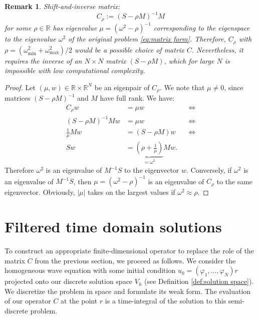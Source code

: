 \documentclass[a4paper,11pt,bibliography=totoc,listof=totoc,headinclude=true,cleardoublepage=empty,oneside]{scrbook}
\newtheorem{rem}[theorem]{Remark}
\newcommand{\R}{\mathbb{R}}
\begin{document}
\begin{rem}
    Shift-and-inverse matrix:
    \begin{equation*}
        C_\rho := (S - \rho M)^{-1}M
    \end{equation*}
    for some $\rho \in \R$ has eigenvalue $\mu = (\omega^2 - \rho)^{-1}$ corresponding to the eigenspace to the eigenvalue $\omega^2$ of the original problem \eqref{eq:matrix form}. Therefore, $C_\rho$ with $\rho = (\omega^2_{\min}+\omega^2_{\max})/2 $ would be a possible choice of matrix $C$. Nevertheless, it requires the inverse of an $N\times N$ matrix $(S - \rho M)$, which for large $N$ is impossible with low computational complexity.
\end{rem}

\begin{proof}
    Let $(\mu, w)\in \R\times\R^N$ be an eigenpair of $C_\rho$. We note that $\mu \neq 0$, since matrices $(S-\rho M)^{-1}$ and $M$ have full rank. We have:
    \begin{align*}
        C_\rho w &= \mu w &&\iff \\
        (S - \rho M)^{-1}Mw &= \mu w  &&\iff \\
        \frac{1}{\mu}Mw &= (S - \rho M)w &&\iff \\
        Sw &= \underbrace{\left(\rho + \frac{1}{\mu}\right)}_{=\omega^2} Mw.&& 
    \end{align*}
    Therefore $\omega^2$ is an eigenvalue of $M^{-1}S$ to the eigenvector $w$. Conversely, if $\omega^2$ is an eigenvalue of $M^{-1}S$, then $\mu = (\omega^2 - \rho)^{-1}$ is an eigenvalue of $C_\rho$ to the same eigenvector. Obviously, $|\mu|$ takes on the largest values if $\omega^2 \approx \rho$.
\end{proof}

\section{Filtered time domain solutions}
To construct an appropriate finite-dimensional operator to replace the role of the matrix $C$ from the previous section, we proceed as follows. We consider the homogeneous wave equation with some initial condition $u_0 = (\varphi_1, \dots, \varphi_N)r$ projected onto our discrete solution space $V_h$ (see Definition \ref{def:solution space}). We discretize the problem in space and formulate its weak form. The evaluation of our operator $C$ at the point $r$ is a time-integral of the solution to this semi-discrete problem.
\end{document}
